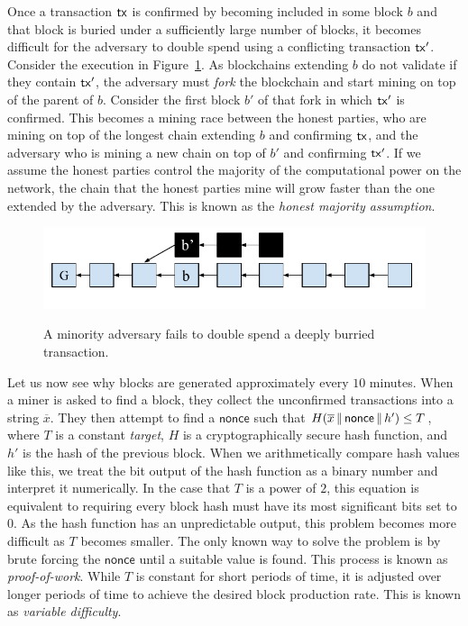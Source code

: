 Once a transaction $\mathsf{tx}$ is confirmed by becoming included in some block $b$ and
that block is buried under a sufficiently large number of blocks, it
becomes difficult for the adversary to double spend using a conflicting
transaction $\mathsf{tx}'$. Consider the execution in Figure~\ref{fig.adversary-race}.
As blockchains extending $b$ do not validate if they
contain $\mathsf{tx}'$, the adversary must \emph{fork} the blockchain and start mining
on top of the parent of $b$. Consider the first block $b'$ of that fork in which
$\mathsf{tx}'$ is confirmed. This becomes a mining race between the honest parties, who
are mining on top of the longest chain extending $b$ and confirming $\mathsf{tx}$, and
the adversary who is mining a new chain on top of $b'$ and confirming $\mathsf{tx}'$. If
we assume the honest parties control the majority of the computational power on
the network, the chain that the honest parties mine will grow faster than the
one extended by the adversary. This is known as the \emph{honest majority
assumption}.

\begin{figure}[h]
    \caption{
    A minority adversary fails to double spend a deeply burried transaction.
    }
    \centering
    \includegraphics[width=0.7\columnwidth,keepaspectratio]{chapters/introduction/figures/adversary-race.pdf}
    \label{fig.adversary-race}
\end{figure}

Let us now see why blocks are generated approximately every $10$ minutes.
When a miner is asked to find a block, they collect the unconfirmed transactions
into a string $\overline{x}$. They then attempt to find a $\textsf{nonce}$ such
that $H(\overline{x} \,\|\, \textsf{nonce} \,\|\, h') \leq T$, where $T$ is a constant
\emph{target}, $H$ is a cryptographically secure hash function, and $h'$ is the
hash of the previous block. When we arithmetically compare hash values like this,
we treat the bit output of the hash function as a binary number and interpret it
numerically. In the case that $T$ is a power of $2$, this equation is
equivalent to requiring every block hash must have its most significant bits set
to $0$. As the hash function has an unpredictable output, this problem becomes
more difficult as $T$ becomes smaller. The only known way to solve the problem
is by brute forcing the $\textsf{nonce}$ until a suitable value is found. This
process is known as \emph{proof-of-work}.
While $T$ is constant for short periods
of time, it is adjusted over longer periods of time to achieve the desired
block production rate. This is known as \emph{variable difficulty}.

